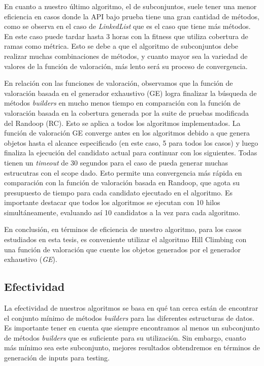 En cuanto a nuestro último algoritmo, el de subconjuntos, suele tener una menor eficiencia en casos donde la API bajo prueba tiene una gran cantidad de métodos, como se observa en el caso de \emph{LinkedList} que es el caso que tiene más métodos. En este caso puede tardar hasta 3 horas con la fitness que utiliza cobertura de ramas como métrica. Esto se debe a que el algoritmo de subconjuntos debe realizar muchas combinaciones de métodos, y cuanto mayor sea la variedad de valores de la función de valoración, más lento será su proceso de convergencia.

En relación con las funciones de valoración, observamos que la función de valoración basada en el generador exhaustivo (GE) logra finalizar la búsqueda de métodos \emph{builders} en mucho menos tiempo en comparación con la función de valoración basada en la cobertura generada por la suite de pruebas modificada del Randoop (RC). Esto se aplica a todos los algoritmos implementados. La función de valoración GE converge antes en los algoritmos debido a que genera objetos hasta el alcance especificado (en este caso, 5 para todos los casos) y luego finaliza la ejecución del candidato actual para continuar con los siguientes. Todas tienen un \emph{timeout} de 30 segundos para el caso de pueda generar muchas estrucutras con el scope dado. Esto permite una convergencia más rápida en comparación con la función de valoración basada en Randoop, que agota su presupuesto de tiempo para cada candidato ejecutado en el algoritmo. Es importante destacar que todos los algoritmos se ejecutan con 10 hilos simultáneamente, evaluando así 10 candidatos a la vez para cada algoritmo.

En conclusión, en términos de eficiencia de nuestro algoritmo, para los casos estudiados en esta tesis, es conveniente utilizar el algoritmo Hill Climbing con una función de valoración que cuente los objetos generados por el generador exhaustivo (\emph{GE}).



\subsection{Efectividad}

La efectividad de nuestros algoritmos se basa en qué tan cerca están de encontrar el conjunto mínimo de métodos \emph{builders} para las diferentes estructuras de datos. Es importante tener en cuenta que siempre encontramos al menos un subconjunto de métodos \emph{builders} que es suficiente para su utilización. Sin embargo, cuanto más mínimo sea este subconjunto, mejores resultados obtendremos en términos de generación de inputs para testing.

